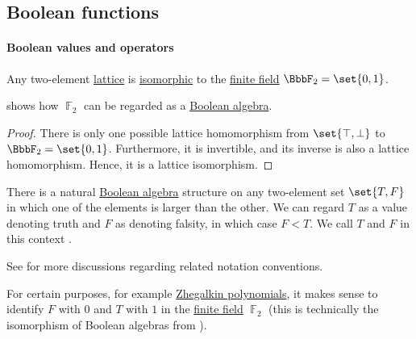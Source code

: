 \subsection{Boolean functions}\label{subsec:boolean_functions}

\paragraph{Boolean values and operators}

\begin{proposition}\label{thm:two_element_lattice}
  Any two-element \hyperref[def:lattice]{lattice} is \hyperref[def:lattice/homomorphism]{isomorphic} to the \hyperref[def:finite_field]{finite field} \( \BbbF_2 = \set{ 0, 1 } \).
\end{proposition}
\begin{comments}
  \item {} shows how \( \BbbF_2 \) can be regarded as a \hyperref[def:boolean_algebra]{Boolean algebra}.
\end{comments}
\begin{proof}
  There is only one possible lattice homomorphism from \( \set{ \top, \bot } \) to \( \BbbF_2 = \set{ 0, 1 } \). Furthermore, it is invertible, and its inverse is also a lattice homomorphism. Hence, it is a lattice isomorphism.
\end{proof}

\begin{concept}\label{con:boolean_value}\mimprovised
  There is a natural \hyperref[def:boolean_algebra]{Boolean algebra} structure on any two-element set \( \set{ T, F } \) in which one of the elements is larger than the other. We can regard \( T \) as a value denoting truth and \( F \) as denoting falsity, in which case \( F < T \). We call \( T \) and \( F \) in this context .
\end{concept}
\begin{comments}
  \item See  for more discussions regarding related notation conventions.

  \item For certain purposes, for example \hyperref[def:zhegalkin_polynomial]{Zhegalkin polynomials}, it makes sense to identify \( F \) with \( 0 \) and \( T \) with \( 1 \) in the \hyperref[def:finite_field]{finite field} \( \BbbF_2 \) (this is technically the isomorphism of Boolean algebras from ).
\end{comments}

